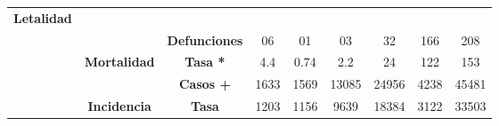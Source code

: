 \begin{tabular}{ccc|cccccc|}
		\multicolumn{1}{c|}{\multirow{-2}{*}{\cellcolor[HTML]{E2EFDA}\textbf{Letalidad}}} &
		\cellcolor[HTML]{E2EFDA} &
		\multicolumn{1}{c|}{\cellcolor[HTML]{E2EFDA}} &
		\multicolumn{1}{c|}{\cellcolor[HTML]{E2EFDA}} &
		\multicolumn{1}{c|}{\cellcolor[HTML]{E2EFDA}} &
		\multicolumn{1}{c|}{\cellcolor[HTML]{E2EFDA}} &
		\multicolumn{1}{c|}{\cellcolor[HTML]{E2EFDA}} &
		\cellcolor[HTML]{E2EFDA} \\ \cline{2-2}
		\rowcolor[HTML]{E2EFDA} 
		\multicolumn{1}{|c|}{\cellcolor[HTML]{E2EFDA}} &
		\multicolumn{1}{c|}{\cellcolor[HTML]{E2EFDA}} &
		\multirow{-2}{*}{\cellcolor[HTML]{E2EFDA}\textbf{Defunciones}} &
		\multicolumn{1}{c|}{\multirow{-2}{*}{\cellcolor[HTML]{E2EFDA}06}} &
		\multicolumn{1}{c|}{\multirow{-2}{*}{\cellcolor[HTML]{E2EFDA}01}} &
		\multicolumn{1}{c|}{\multirow{-2}{*}{\cellcolor[HTML]{E2EFDA}03}} &
		\multicolumn{1}{c|}{\multirow{-2}{*}{\cellcolor[HTML]{E2EFDA}32}} &
		\multicolumn{1}{c|}{\multirow{-2}{*}{\cellcolor[HTML]{E2EFDA}166}} &
		\multirow{-2}{*}{\cellcolor[HTML]{E2EFDA}208} \\ \cline{3-9} 
		\rowcolor[HTML]{E2EFDA} 
		\multicolumn{1}{|c|}{\cellcolor[HTML]{E2EFDA}} &
		\multicolumn{1}{c|}{\multirow{-2}{*}{\cellcolor[HTML]{E2EFDA}\textbf{Mortalidad}}} &
		\textbf{Tasa *} &
		\multicolumn{1}{c|}{\cellcolor[HTML]{E2EFDA}4.4} &
		\multicolumn{1}{c|}{\cellcolor[HTML]{E2EFDA}0.74} &
		\multicolumn{1}{c|}{\cellcolor[HTML]{E2EFDA}2.2} &
		\multicolumn{1}{c|}{\cellcolor[HTML]{E2EFDA}24} &
		\multicolumn{1}{c|}{\cellcolor[HTML]{E2EFDA}122} &
		153 \\ \cline{2-9} 
		\rowcolor[HTML]{E2EFDA} 
		\multicolumn{1}{|c|}{\cellcolor[HTML]{E2EFDA}} &
		\multicolumn{1}{c|}{\cellcolor[HTML]{E2EFDA}} &
		\textbf{Casos +} &
		\multicolumn{1}{c|}{\cellcolor[HTML]{E2EFDA}1633} &
		\multicolumn{1}{c|}{\cellcolor[HTML]{E2EFDA}1569} &
		\multicolumn{1}{c|}{\cellcolor[HTML]{E2EFDA}13085} &
		\multicolumn{1}{c|}{\cellcolor[HTML]{E2EFDA}24956} &
		\multicolumn{1}{c|}{\cellcolor[HTML]{E2EFDA}4238} &
		45481 \\ \cline{3-9} 
		\rowcolor[HTML]{E2EFDA} 
		\multicolumn{1}{|c|}{\multirow{-6}{*}{\cellcolor[HTML]{E2EFDA}\textbf{2022}}} &
		\multicolumn{1}{c|}{\multirow{-2}{*}{\cellcolor[HTML]{E2EFDA}\textbf{Incidencia}}} &
		\textbf{Tasa} &
		\multicolumn{1}{c|}{\cellcolor[HTML]{E2EFDA}1203} &
		\multicolumn{1}{c|}{\cellcolor[HTML]{E2EFDA}1156} &
		\multicolumn{1}{c|}{\cellcolor[HTML]{E2EFDA}9639} &
		\multicolumn{1}{c|}{\cellcolor[HTML]{E2EFDA}18384} &
		\multicolumn{1}{c|}{\cellcolor[HTML]{E2EFDA}3122} &
		33503 \\ \hline
	\end{tabular}
